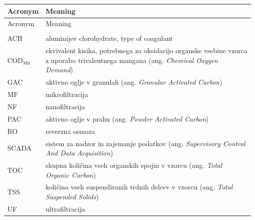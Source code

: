 \begin{longtable}[l]{@{}p{}@{}p{}@{}}
\hline
Acronym & Meaning\\
\hline
\endfirsthead
\hline
Acronym & Meaning\\
\hline
\endhead
&\\
ACH & aluminijev clorohydrate, type of coagulant\\
COD$_{\text{Mn}}$ & ekvivalent kisika, potrebnega za oksidacijo organske vsebine vzorca z uporabo trivalentnega mangana (ang. \emph{Chemical Oxygen Demand})\\
GAC & aktivno oglje v granulah (ang. \emph{Granular Activated Carbon})\\
MF & mikrofiltracija\\
NF & nanofiltracija\\
PAC & aktivno oglje v prahu (ang. \emph{Powder Activated Carbon})\\
RO & reverzna osmoza\\
SCADA & sistem za nadzor in zajemanje podatkov (ang. \emph{Supervisory Control And Data Acquisition})\\
TOC & skupna količina vseh organskih spojin v vzorcu (ang. \emph{Total Organic Carbon})\\
TSS & količina vseh suspendiranih trdnih delcev v vzorcu (ang. \emph{Total Suspended Solids})\\
UF & ultrafiltracija\\
\end{longtable}

\newpage
